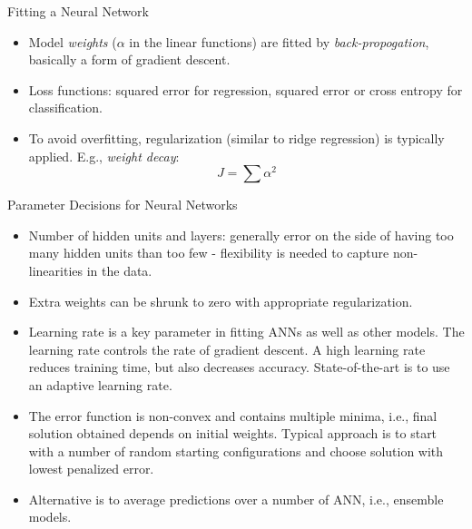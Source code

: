 \documentclass[aspectratio=169]{beamer}
\begin{document}
\begin{frame}{Fitting a Neural Network}
    \begin{itemize}
        \item Model \textit{weights} ($\alpha$ in the linear functions) are fitted by \textit{back-propogation}, basically a form of gradient descent.
        \item Loss functions: squared error for regression, squared error or cross entropy for classification.
        \item To avoid overfitting, regularization (similar to ridge regression) is typically applied. E.g., \textit{weight decay}:
        \begin{equation*}
            J = \sum \alpha^2
        \end{equation*}
    \end{itemize}
\end{frame}


\begin{frame}{Parameter Decisions for Neural Networks}
    \begin{itemize}
        \item Number of hidden units and layers: generally error on the side of having too many hidden units than too few - flexibility is needed to capture non-linearities in the data.
        \item Extra weights can be shrunk to zero with appropriate regularization.
        \item Learning rate is a key parameter in fitting ANNs as well as other models. The learning rate controls the rate of gradient descent. A high learning rate reduces training time, but also decreases accuracy. State-of-the-art is to use an adaptive learning rate.
        \item The error function is non-convex and contains multiple minima, i.e., final solution obtained depends on initial weights. Typical approach is to start with a number of random starting configurations and choose solution with lowest penalized error.
        \item Alternative is to average predictions over a number of ANN, i.e., ensemble models.
    \end{itemize}
\end{frame}
\end{document}
